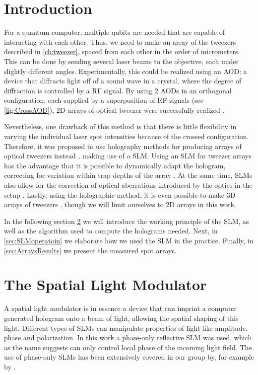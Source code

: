 \section{Introduction}

For a quantum computer, multiple qubits are needed that are capable of interacting with each other. 
Thus, we need to make an array of the tweezers described in \cref{ch:tweezer}, spaced from each other in the order of micrometers. 
This can be done by sending several laser beams to the objective, each under slightly different angles. 
Experimentally, this could be realized using an \ac{AOD}: a device that diffracts light off of a sound wave in a crystal, where the degree of diffraction is controlled by a \ac{RF} signal. 
By using 2 AODs in an orthogonal configuration, each supplied by a superposition of RF signals (see \cref{fig:CrossAOD}), 2D arrays of optical tweezer were successfully realized \cite{Manuel2016}. 

Nevertheless, one drawback of this method is that there is little flexibility in varying the individual laser spot intensities because of the crossed configuration.
Therefore, it was proposed to use holography methods for producing arrays of optical tweezers instead \cite{Bergamini2004}, making use of a \acf{SLM}.
Using an SLM for tweezer arrays has the advantage that it is possible to dynamically adapt the hologram, correcting for variation within trap depths of the array \cite{Nogrette2014}. 
At the same time, SLMs also allow for the correction of optical aberrations introduced by the optics in the setup \cite{Bijnen2015}.
Lastly, using the holographic method, it is even possible to make 3D arrays of tweezers \cite{DiLeonardo2007,Barredo2016}, though we will limit ourselves to 2D arrays in this work.

In the following section \ref{sec:SLM} we will introduce the working principle of the SLM, as well as the algorithm used to compute the holograms needed.
Next, in \cref{sec:SLMoperatoin} we elaborate how we used the SLM in the practice. 
Finally, in \cref{sec:ArraysResults} we present the measured spot arrays.



\section{The Spatial Light Modulator}\label{sec:SLM}

A spatial light modulator is in essence a device that can imprint a computer generated hologram onto a beam of light, allowing the spatial shaping of this light.
Different types of SLMs can manipulate properties of light like amplitude, phase and polarization.
In this work a phase-only reflective SLM was used, which as the name suggests can only control local phase of the incoming light field.
The use of phase-only SLMs has been extensively covered in our group by, for example by \cite{Bijnen2015,Dijk2012,Bijnen2013}. 

